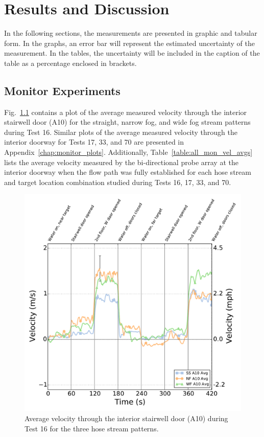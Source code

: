 \documentclass[12pt,oneside]{book}
\begin{document}

\chapter{Results and Discussion}
\label{chap:results}
In the following sections, the measurements are presented in graphic and tabular form. In the graphs, an error bar will represent the estimated uncertainty of the measurement. In the tables, the uncertainty will be included in the caption of the table as a percentage enclosed in brackets.

\section{Monitor Experiments}
\label{sec:monitor_results}

Fig.~\ref{fig:Test_16_BDP_A10_Avg_All} contains a plot of the average measured velocity through the interior stairwell door (A10) for the straight, narrow fog, and wide fog stream patterns during Test 16. Similar plots of the average measured velocity through the interior doorway for Tests 17, 33, and 70 are presented in Appendix~\ref{chap:monitor_plots}. Additionally, Table~\ref{table:all_mon_vel_avgs} lists the average velocity measured by the bi-directional probe array at the interior doorway when the flow path was fully established for each hose stream and target location combination studied during Tests 16, 17, 33, and 70.

\begin{figure}[!ht]
	\includegraphics[width=\columnwidth]{../Figures/Plots/Test_16_West_063014_BDP_A10_stream_avgs}
	\caption{Average velocity through the interior stairwell door (A10) during Test 16 for the three hose stream patterns.}
	\label{fig:Test_16_BDP_A10_Avg_All}
\end{figure}
\end{document}
